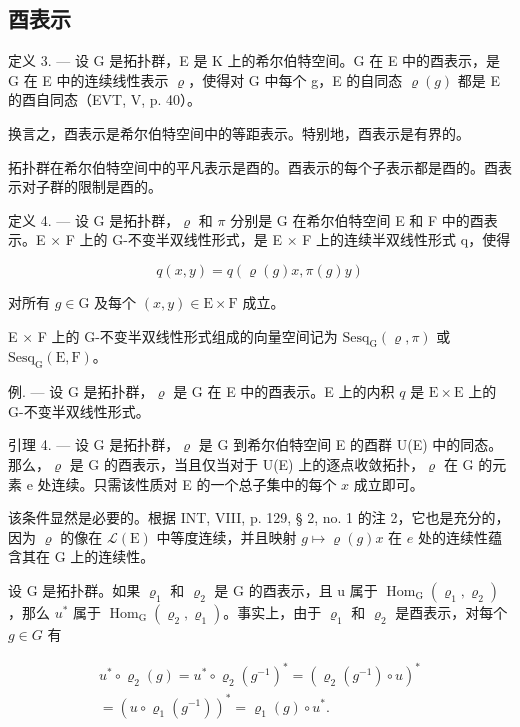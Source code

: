 \subsection{酉表示}

定义 3. --- 设 G 是拓扑群，E 是 K 上的希尔伯特空间。G 在 E 中的酉表示，是 G 在 E 中的连续线性表示 \(\varrho\)，使得对 G 中每个 g，E 的自同态 \(\varrho(g)\) 都是 E 的酉自同态（EVT, V, p. 40）。

换言之，酉表示是希尔伯特空间中的等距表示。特别地，酉表示是有界的。

拓扑群在希尔伯特空间中的平凡表示是酉的。酉表示的每个子表示都是酉的。酉表示对子群的限制是酉的。

定义 4. --- 设 G 是拓扑群，\(\varrho\) 和 \(\pi\) 分别是 G 在希尔伯特空间 E 和 F 中的酉表示。E × F 上的 G-不变半双线性形式，是 E × F 上的连续半双线性形式 q，使得

\[
q (x, y) = q (\varrho (g) x, \pi (g) y)
\]

对所有 \(g \in \mathrm{G}\) 及每个 \((x, y) \in \mathrm{E} \times \mathrm{F}\) 成立。

E × F 上的 G-不变半双线性形式组成的向量空间记为 \(\mathrm{Sesq}_{\mathrm{G}}(\varrho,\pi)\) 或 \(\mathrm{Sesq}_{\mathrm{G}}(\mathrm{E},\mathrm{F})\)。

例. --- 设 G 是拓扑群，\(\varrho\) 是 G 在 E 中的酉表示。E 上的内积 \(q\) 是 \(\mathrm{E} \times \mathrm{E}\) 上的 G-不变半双线性形式。

引理 4. --- 设 G 是拓扑群，\(\varrho\) 是 G 到希尔伯特空间 E 的酉群 U(E) 中的同态。那么，\(\varrho\) 是 G 的酉表示，当且仅当对于 U(E) 上的逐点收敛拓扑，\(\varrho\) 在 G 的元素 e 处连续。只需该性质对 E 的一个总子集中的每个 \(x\) 成立即可。

该条件显然是必要的。根据 INT, VIII, p. 129, § 2, no. 1 的注 2，它也是充分的，因为 \(\varrho\) 的像在 \(\mathcal{L}(\mathrm{E})\) 中等度连续，并且映射 \(g \mapsto \varrho(g)x\) 在 \(e\) 处的连续性蕴含其在 G 上的连续性。

设 G 是拓扑群。如果 \(\varrho_{1}\) 和 \(\varrho_{2}\) 是 G 的酉表示，且 u 属于 \(\operatorname{Hom}_{\mathrm{G}}(\varrho_{1},\varrho_{2})\)，那么 \(u^{*}\) 属于 \(\operatorname{Hom}_{\mathrm{G}}(\varrho_{2},\varrho_{1})\)。事实上，由于 \(\varrho_{1}\) 和 \(\varrho_{2}\) 是酉表示，对每个 \(g\in G\) 有

\[
\begin{array}{r} u ^ {*} \circ \varrho_ {2} (g) = u ^ {*} \circ \varrho_ {2} (g ^ {- 1}) ^ {*} = (\varrho_ {2} (g ^ {- 1}) \circ u) ^ {*} \\ = (u \circ \varrho_ {1} (g ^ {- 1})) ^ {*} = \varrho_ {1} (g) \circ u ^ {*}. \end{array}
\]

